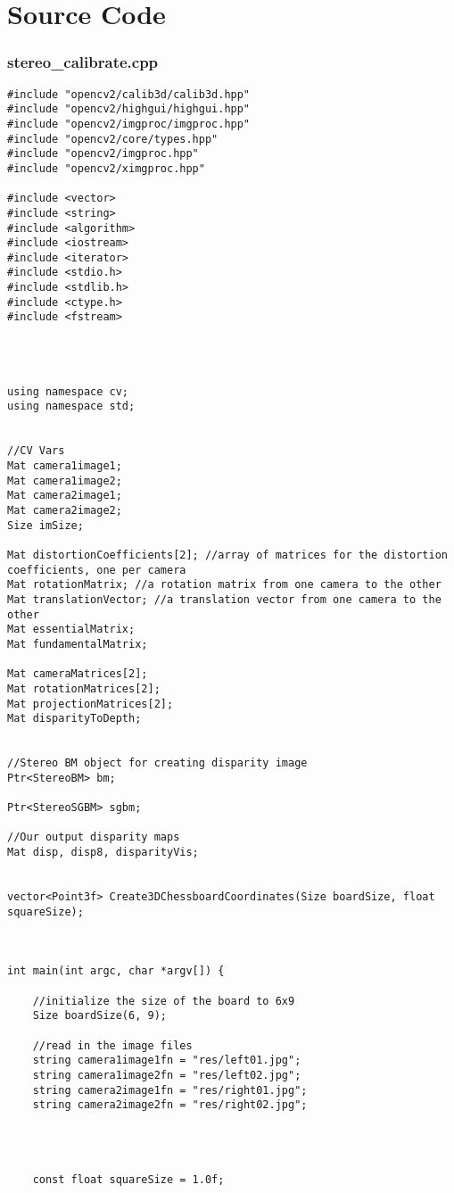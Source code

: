 
\section{Source Code}
\subsubsection{stereo\_calibrate.cpp}
\begin{verbatim}
#include "opencv2/calib3d/calib3d.hpp"
#include "opencv2/highgui/highgui.hpp"
#include "opencv2/imgproc/imgproc.hpp"
#include "opencv2/core/types.hpp"
#include "opencv2/imgproc.hpp"
#include "opencv2/ximgproc.hpp"

#include <vector>
#include <string>
#include <algorithm>
#include <iostream>
#include <iterator>
#include <stdio.h>
#include <stdlib.h>
#include <ctype.h>
#include <fstream>




using namespace cv;
using namespace std;


//CV Vars
Mat camera1image1;
Mat camera1image2;
Mat camera2image1;
Mat camera2image2;
Size imSize;

Mat distortionCoefficients[2]; //array of matrices for the distortion coefficients, one per camera
Mat rotationMatrix; //a rotation matrix from one camera to the other
Mat translationVector; //a translation vector from one camera to the other
Mat essentialMatrix;
Mat fundamentalMatrix;

Mat cameraMatrices[2];
Mat rotationMatrices[2];
Mat projectionMatrices[2];
Mat disparityToDepth;


//Stereo BM object for creating disparity image
Ptr<StereoBM> bm;

Ptr<StereoSGBM> sgbm;

//Our output disparity maps
Mat disp, disp8, disparityVis;


vector<Point3f> Create3DChessboardCoordinates(Size boardSize, float squareSize);



int main(int argc, char *argv[]) {

	//initialize the size of the board to 6x9
	Size boardSize(6, 9);

	//read in the image files
	string camera1image1fn = "res/left01.jpg";
	string camera1image2fn = "res/left02.jpg";
	string camera2image1fn = "res/right01.jpg";
	string camera2image2fn = "res/right02.jpg";




	const float squareSize = 1.0f;


\end{verbatim}
